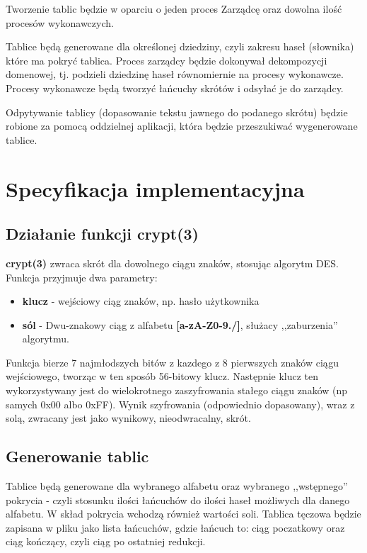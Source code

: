 \documentclass[a4paper,11pt]{article}
\begin{document}
Tworzenie tablic będzie w oparciu o jeden proces Zarządcę oraz dowolna ilość procesów wykonawczych. 

Tablice będą generowane dla określonej dziedziny, czyli zakresu haseł (słownika) które ma pokryć tablica. Proces zarządcy będzie dokonywał dekompozycji domenowej, tj. podzieli dziedzinę haseł równomiernie na procesy wykonawcze. Procesy wykonawcze będą tworzyć łańcuchy skrótów i odsyłać je do zarządcy.

Odpytywanie tablicy (dopasowanie tekstu jawnego do podanego skrótu) będzie robione za pomocą oddzielnej aplikacji, która będzie przeszukiwać wygenerowane tablice.

\section{Specyfikacja implementacyjna}

\subsection{Działanie funkcji crypt(3)}

\textbf{crypt(3)} zwraca skrót dla dowolnego ciągu znaków, stosując algorytm DES. Funkcja przyjmuje dwa parametry:
\begin{itemize}
	\item \textbf{klucz} - wejściowy ciąg znaków, np. hasło użytkownika
	\item \textbf{sól} - Dwu-znakowy ciąg z alfabetu \textbf{[a-zA-Z0-9./]}, służacy ,,zaburzenia'' algorytmu.
\end{itemize}

Funkcja bierze 7 najmłodszych bitów z kazdego z 8 pierwszych znaków ciągu wejściowego, tworząc w ten sposób 56-bitowy klucz. Następnie klucz ten wykorzystywany jest do wielokrotnego zaszyfrowania stałego ciągu znaków (np samych 0x00 albo 0xFF). Wynik szyfrowania (odpowiednio dopasowany), wraz z solą, zwracany jest jako wynikowy, nieodwracalny, skrót.

\subsection{Generowanie tablic}

Tablice będą generowane dla wybranego alfabetu oraz wybranego ,,wstępnego'' pokrycia - czyli stosunku ilości łańcuchów do ilości haseł możliwych dla danego alfabetu. W skład pokrycia wchodzą również wartości soli. Tablica tęczowa będzie zapisana w pliku jako lista łańcuchów, gdzie łańcuch to: ciąg poczatkowy oraz ciąg kończący, czyli ciąg po ostatniej redukcji.
\end{document}
